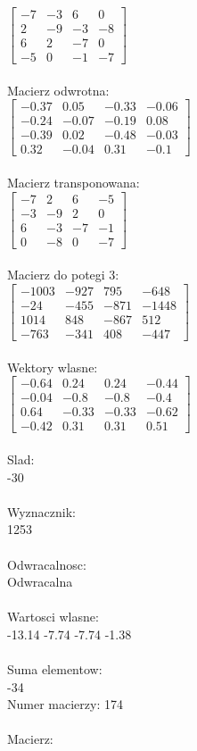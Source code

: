 \documentclass[a4paper,12pt]{article}
\begin{document}
$\begin{bmatrix} -7&-3&6&0\\2&-9&-3&-8\\6&2&-7&0\\-5&0&-1&-7 \end{bmatrix}$
\\
\\
Macierz odwrotna:\\

$\begin{bmatrix} -0.37&0.05&-0.33&-0.06\\-0.24&-0.07&-0.19&0.08\\-0.39&0.02&-0.48&-0.03\\0.32&-0.04&0.31&-0.1 \end{bmatrix}$
\\
\\
Macierz transponowana:\\

$\begin{bmatrix} -7&2&6&-5\\-3&-9&2&0\\6&-3&-7&-1\\0&-8&0&-7 \end{bmatrix}$
\\
\\
Macierz do potegi 3:\\

$\begin{bmatrix} -1003&-927&795&-648\\-24&-455&-871&-1448\\1014&848&-867&512\\-763&-341&408&-447 \end{bmatrix}$
\\
\\
Wektory wlasne:\\

$\begin{bmatrix} -0.64&0.24&0.24&-0.44\\-0.04&-0.8&-0.8&-0.4\\0.64&-0.33&-0.33&-0.62\\-0.42&0.31&0.31&0.51 \end{bmatrix}$
\\
\\
Slad:\\
-30
\\
\\
Wyznacznik:\\
1253
\\
\\
Odwracalnosc:\\
Odwracalna
\\
\\
Wartosci wlasne:\\
-13.14 -7.74 -7.74 -1.38
\\
\\
Suma elementow:\\
-34
\\
\newpage
Numer macierzy:
174
\\
\\
Macierz:\\
\end{document}
